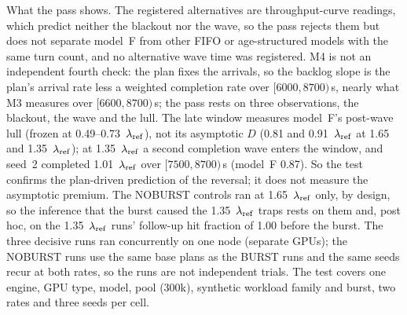 What the pass shows. The registered alternatives are throughput-curve readings, which predict neither the blackout nor the wave, so
the pass rejects them but does not separate model~F from other FIFO or age-structured models with the same turn count, and no
alternative wave time was registered. M4 is not an independent fourth check: the plan
fixes the arrivals, so the backlog slope is the plan's arrival rate less a weighted completion rate over $[6000,8700)$\,s, nearly
what M3 measures over $[6600,8700)$\,s; the pass rests on three observations, the blackout, the wave and the lull. The late window measures
model~F's post-wave lull (frozen at 0.49--0.73~$\lambda_{\mathrm{ref}}$), not its asymptotic $D$ (0.81 and 0.91~$\lambda_{\mathrm{ref}}$ at 1.65 and 1.35~$\lambda_{\mathrm{ref}}$); at 1.35~$\lambda_{\mathrm{ref}}$ a second
completion wave enters the window, and seed~2 completed 1.01~$\lambda_{\mathrm{ref}}$ over $[7500,8700)$\,s (model~F 0.87). So the test confirms the plan-driven prediction of the
reversal; it does not measure the asymptotic premium. The NOBURST
controls ran at 1.65~$\lambda_{\mathrm{ref}}$ only, by design, so the inference that the burst caused the 1.35~$\lambda_{\mathrm{ref}}$ traps rests on them and, post hoc, on
the 1.35~$\lambda_{\mathrm{ref}}$ runs' follow-up hit fraction of 1.00 before the burst. The three decisive runs ran concurrently on one node (separate GPUs);
the NOBURST runs use the same base plans as the BURST runs and the same seeds recur at both rates, so the runs are not independent
trials. The test covers one engine, GPU type, model, pool (300k), synthetic workload family and burst, two rates and three seeds
per cell.

